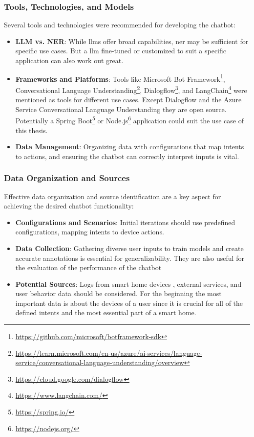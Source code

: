 \subsubsection{Tools, Technologies, and Models}

Several tools and technologies were recommended for developing the chatbot:

\begin{itemize}
    \item \textbf{LLM vs. NER}: While \glspl{llm} offer broad capabilities, \gls{ner} may be sufficient for specific use cases. But a \gls{llm} fine-tuned or customized to suit a specific application can also work out great.
    \item \textbf{Frameworks and Platforms}:  Tools like Microsoft Bot Framework\footnote{\url{https://github.com/microsoft/botframework-sdk}}, Conversational Language Understanding\footnote{\url{https://learn.microsoft.com/en-us/azure/ai-services/language-service/conversational-language-understanding/overview}}, Dialogflow\footnote{\url{https://cloud.google.com/dialogflow}}, and LangChain\footnote{\url{https://www.langchain.com/}} were mentioned as tools for different use cases. Except Dialogflow and the Azure Service Conversational Language Understanding they are open source. Potentially a Spring Boot\footnote{\url{https://spring.io/}} or Node.js\footnote{\url{https://nodejs.org/}} application could suit the use case of this thesis.
    \item \textbf{Data Management}: Organizing data with configurations that map intents to actions, and ensuring the chatbot can correctly interpret inputs is vital.
\end{itemize}

\subsubsection{Data Organization and Sources}

Effective data organization and source identification are a key aspect for achieving the desired chatbot functionality:

\begin{itemize}
    \item \textbf{Configurations and Scenarios}: Initial iterations should use predefined configurations, mapping intents to device actions.
    \item \textbf{Data Collection}: Gathering diverse user inputs to train models and create accurate annotations is essential for generalizability. They are also useful for the evaluation of the performance of the chatbot
    \item \textbf{Potential Sources}: Logs from smart home devices , external services, and user behavior data should be considered. For the beginning the most important data is about the devices of a user since it is crucial for all of the defined intents and the most essential part of a smart home.
\end{itemize}


